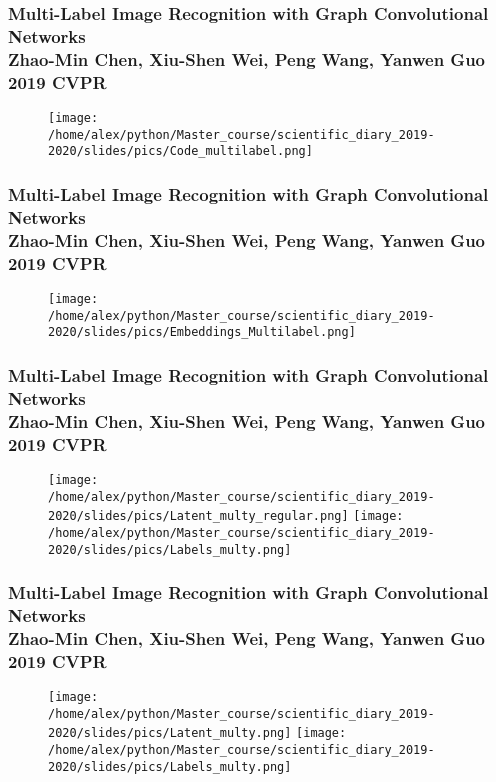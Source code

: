 \documentclass[fleqn, xcolor=x11names]{beamer}
\begin{document}
\begin{frame}\frametitle{\footnotesize{Multi-Label Image Recognition with Graph Convolutional Networks\\
Zhao-Min Chen, Xiu-Shen Wei, Peng Wang, Yanwen Guo 2019 CVPR
}}

\begin{figure}[h]
\begin{center}
\texttt{[image: /home/alex/python/Master\_course/scientific\_diary\_2019-2020/slides/pics/Code\_multilabel.png]}
\end{center}
\end{figure}

\end{frame}

\begin{frame}\frametitle{\footnotesize{Multi-Label Image Recognition with Graph Convolutional Networks\\
Zhao-Min Chen, Xiu-Shen Wei, Peng Wang, Yanwen Guo 2019 CVPR
}}
\begin{figure}[h]
\begin{center}
\texttt{[image: /home/alex/python/Master\_course/scientific\_diary\_2019-2020/slides/pics/Embeddings\_Multilabel.png]}
\end{center}
\end{figure}

\end{frame}

\begin{frame}\frametitle{\footnotesize{Multi-Label Image Recognition with Graph Convolutional Networks\\
Zhao-Min Chen, Xiu-Shen Wei, Peng Wang, Yanwen Guo 2019 CVPR
}}
\begin{figure}[h]
\begin{center}
\texttt{[image: /home/alex/python/Master\_course/scientific\_diary\_2019-2020/slides/pics/Latent\_multy\_regular.png]}
\texttt{[image: /home/alex/python/Master\_course/scientific\_diary\_2019-2020/slides/pics/Labels\_multy.png]}
\end{center}
\end{figure}

\end{frame}

\begin{frame}\frametitle{\footnotesize{Multi-Label Image Recognition with Graph Convolutional Networks\\
Zhao-Min Chen, Xiu-Shen Wei, Peng Wang, Yanwen Guo 2019 CVPR
}}
\begin{figure}[h]
\begin{center}
\texttt{[image: /home/alex/python/Master\_course/scientific\_diary\_2019-2020/slides/pics/Latent\_multy.png]}
\texttt{[image: /home/alex/python/Master\_course/scientific\_diary\_2019-2020/slides/pics/Labels\_multy.png]}
\end{center}
\end{figure}

\end{frame}
\end{document}
